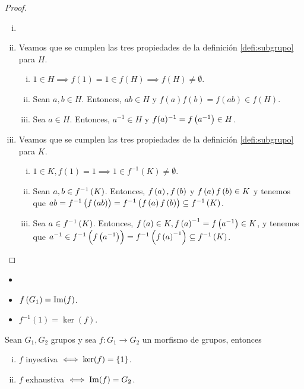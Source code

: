 \begin{proof}
    \begin{enumerate}[i)]
        \item[]
        \item Veamos que se cumplen las tres propiedades de la definición \ref{defi:subgrupo} para $H$.
        \begin{enumerate}[i)]
            \item $1 \in H \implies f(1) = 1 \in f(H) \implies f(H) \neq \emptyset$.
            \item Sean $a, b \in H$. Entonces, $ab \in H$ y $f(a) f(b) = f(ab) \in f(H)$.
            \item Sea $a \in H$. Entonces, $a^{-1} \in H$ y $f(a)^{-1} = f\left( a ^{-1}\right) \in H$.
        \end{enumerate}
        \item Veamos que se cumplen las tres propiedades de la definición \ref{defi:subgrupo} para $K$.
        \begin{enumerate}[i)]
            \item $1 \in K, f(1) = 1 \implies 1 \in f^{-1}(K) \neq \emptyset$.
            \item Sean $a, b \in f^{-1}\left( K\right)$. Entonces, $ f\left( a\right), f\left( b\right)$ y $ f\left( a\right) f\left( b\right) \in K$ y tenemos que $ab = f^{-1}\left( f\left( ab\right) \right) = f^{-1}\left( f\left( a \right) f\left( b\right)\right) \subseteq f^{-1}\left( K\right)$.
            \item Sea $a \in f^{-1}\left( K\right)$. Entonces, $f\left( a\right)\in K, f\left( a\right)^{-1}=f\left( a^{-1}\right) \in K$, y tenemos que $a^{-1} \in f^{-1}\left( f\left( a^{-1}\right) \right) = f^{-1}\left( f\left( a \right) ^{-1} \right) \subseteq f^{-1}\left( K\right)$.
        \end{enumerate}
    \end{enumerate}
\end{proof}

\begin{obs}
    \begin{itemize}
        \item[]
        \item $f\left( G_1 \right) = \operatorname{Im}(f)$.
        \item $f^{-1}(1) = \ker(f)$.
    \end{itemize}
\end{obs}

\begin{prop} Sean $G_1, G_2$ grupos y sea $f\colon G_1\to G_2$ un morfismo de grupos, entonces
    \begin{enumerate}[i)]
        \item $f$ inyectiva $\iff \ker(f) = \left\{1\right\}$.
        \item $f$ exhaustiva $\iff \operatorname{Im}(f) = G_2$.
    \end{enumerate}
\end{prop}

